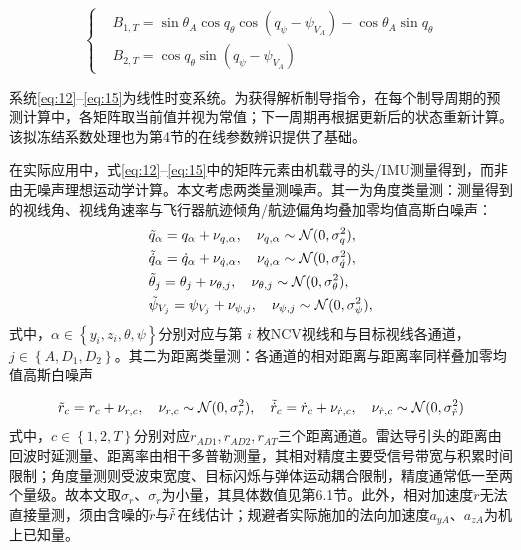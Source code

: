 \begin{equation}
\label{eq:15}
\left\{
\begin{aligned}
& {B_{1,T}} = \sin {\theta _A}\cos {q_\theta }\cos \left( {{q_\psi } - {\psi _{{V_A}}}} \right) - \cos {\theta _A}\sin {q_\theta } \\
& {B_{2,T}} = \cos {q_\theta }\sin \left( {{q_\psi } - {\psi _{{V_A}}}} \right)
\end{aligned}
\right.
\end{equation}
\begin{remark}
系统\eqref{eq:12}--\eqref{eq:15}为线性时变系统。为获得解析制导指令，在每个制导周期的预测计算中，各矩阵取当前值并视为常值；下一周期再根据更新后的状态重新计算。该拟冻结系数处理也为第4节的在线参数辨识提供了基础。
\end{remark}
\begin{assumption}[量测条件]
\label{asm:meas-noise}
在实际应用中，式\eqref{eq:12}--\eqref{eq:15}中的矩阵元素由机载寻的头/IMU测量得到，而非由无噪声理想运动学计算。本文考虑两类量测噪声。其一为角度类量测：测量得到的视线角、视线角速率与飞行器航迹倾角/航迹偏角均叠加零均值高斯白噪声：
\begin{equation}
\label{eq:16}
\begin{gathered}
  \tilde{q}_{\alpha} = {q_{\alpha}} + {\nu _{q,\alpha }},\quad {\nu _{q,\alpha }}\sim \mathcal{N}(0,\sigma _q^2), \hfill \\
  \tildedot{q}_{\alpha} = \dot{q}_{\alpha} + {\nu _{\dot q,\alpha }},\quad {\nu _{\dot q,\alpha }}\sim \mathcal{N}(0,\sigma _{\dot q}^2), \hfill \\
  \tilde{\theta}_{j} = {\theta _{j}} + {\nu _{\theta ,j}},\quad {\nu _{\theta ,j}}\sim \mathcal{N}(0,\sigma _\theta ^2), \hfill \\
  \tilde{\psi}_{V_{j}} = {\psi _{V_{j}}} + {\nu _{\psi ,j}},\quad {\nu _{\psi ,j}}\sim \mathcal{N}(0,\sigma _\psi ^2), \hfill \\ 
\end{gathered}
\end{equation}
式中，$\alpha  \in \left\{ {{y_i},{z_i},\theta ,\psi } \right\}$分别对应与第 $i$ 枚NCV视线和与目标视线各通道，$j \in \left\{ {A,{D_1},{D_2}} \right\}$。其二为距离类量测：各通道的相对距离与距离率同样叠加零均值高斯白噪声

\begin{equation}
\label{eq:16b}
\tilde{r}_{c} = {r_c} + {\nu _{r,c}},\quad {\nu _{r,c}}\sim \mathcal{N}(0,\sigma _r^2),\quad
\tilde{\dot{r}}_{c} = {\dot r_c} + {\nu _{\dot r,c}},\quad {\nu _{\dot r,c}}\sim \mathcal{N}(0,\sigma _{\dot r}^2)
\end{equation}
式中，$c \in \left\{ {1,2,T} \right\}$分别对应${r_{AD1}},{r_{AD2}},{r_{AT}}$三个距离通道。雷达导引头的距离由回波时延测量、距离率由相干多普勒测量，其相对精度主要受信号带宽与积累时间限制；角度量测则受波束宽度、目标闪烁与弹体运动耦合限制，精度通常低一至两个量级\cite{skolnik2008}。故本文取${\sigma _r}$、${\sigma _{\dot r}}$为小量，其具体数值见第6.1节。此外，相对加速度$\ddot{r}$无法直接量测，须由含噪的$\tilde{r}$与$\tilde{\dot{r}}$在线估计；规避者实际施加的法向加速度${a_{yA}}$、${a_{zA}}$为机上已知量。


\end{assumption}

